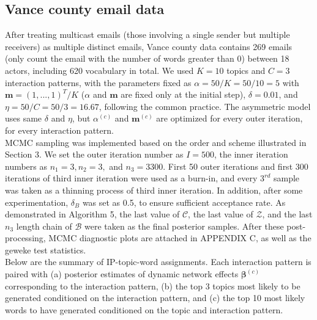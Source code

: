 \documentclass[a4paper]{article}
\begin{document}
\subsection{Vance county email data}
After treating multicast emails (those involving a single sender but multiple receivers) as multiple distinct emails, Vance county data contains 269 emails (only count the email with the number of words greater than 0) between 18 actors, including 620 vocabulary in total. We used $K=10$ topics and $C=3$ interaction patterns, with the parameters fixed as $\alpha=50/K=50/10=5$ with $\boldsymbol{m}=(1,...,1)^T/K$ ($\alpha$ and $\boldsymbol{m}$ are fixed only at the initial step), $\delta=0.01$, and $\eta=50/C=50/3=16.67$, following the common practice. The asymmetric model uses same $\delta$ and $\eta$, but $\alpha^{(c)}$ and $\boldsymbol{m}^{(c)}$ are optimized for every outer iteration, for every interaction pattern. \\ \newline MCMC sampling was implemented based on the order and scheme illustrated in Section 3. We set the outer iteration number as $I=500$, the inner iteration numbers as $n_1=3, n_2=3,$ and $n_3=3300$. First 50 outer iterations and first 300 iterations of third inner iteration were used as a burn-in, and every $3^{rd}$ sample was taken as a thinning process of third inner iteration. In addition, after some experimentation, $\delta_B$ was set as 0.5, to ensure sufficient acceptance rate. As demonstrated in Algorithm 5, the last value of $\mathcal{C}$, the last value of $\mathcal{Z}$, and the last $n_3$ length chain of $\mathcal{B}$ were taken as the final posterior samples. After these post-processing, MCMC diagnostic plots are attached in APPENDIX C, as well as the geweke test statistics. \\\newline
Below are the summary of IP-topic-word assignments. Each interaction pattern is paired with (a) posterior estimates of dynamic network effects $\boldsymbol{\beta}^{(c)}$ corresponding to the interaction pattern, (b) the top 3 topics most likely to be generated conditioned on the interaction pattern, and (c) the top 10 most likely words to have generated conditioned on the topic and interaction pattern.
\end{document}
